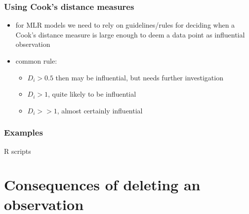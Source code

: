 \documentclass[
	11pt, %
]{beamer}
\begin{document}
\begin{frame}
	\frametitle{Using Cook's distance measures}
	\begin{itemize}
		\item for MLR models we need to rely on guidelines/rules for deciding when a Cook's distance
		measure is large enough to deem a data point as influential observation
		\item common rule:
		\begin{itemize}
			\item $D_i > 0.5$ then may be influential, but needs further investigation
			\item $D_i > 1$, quite likely to be influential
			\item $D_i >> 1$, almost certainly influential
		\end{itemize}
	\end{itemize}
\end{frame}

\begin{frame}[allowframebreaks]
	\frametitle{Examples}
	R scripts
\end{frame}

\section{Consequences of deleting an observation}
\end{document}
